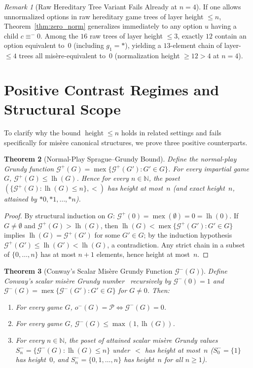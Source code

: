 \documentclass[11pt]{amsart}
\newtheorem{theorem}{Theorem}[section]
\theoremstyle{definition}
\theoremstyle{remark}
\newtheorem{remark}[theorem]{Remark}
\newcommand{\Ppos}{\mathcal{P}}
\newcommand{\Glayer}{\mathcal{G}}
\DeclareMathOperator{\mex}{mex}
\DeclareMathOperator{\lh}{lh}
\DeclareMathOperator{\height}{height}
\begin{document}
\begin{remark}[Raw Hereditary Tree Variant Fails Already at $n = 4$]
If one allows unnormalized options in raw hereditary game trees of layer height $\le n$, Theorem~\ref{thm:zero_norm} generalizes immediately to any option $u$ having a child $c \equiv^- 0$. Among the $16$ raw trees of layer height $\le 3$, exactly $12$ contain an option equivalent to~$0$ (including $g_1 = *$), yielding a $13$-element chain of layer-$\le 4$ trees all mis\`ere-equivalent to~$0$ (normalization height $\ge 12 > 4$ at $n = 4$).
\end{remark}

\section{Positive Contrast Regimes and Structural Scope}
\label{sec:contrast}

To clarify why the bound $\height \le n$ holds in related settings and fails specifically for mis\`ere canonical structures, we prove three positive counterparts.

\begin{theorem}[Normal-Play Sprague--Grundy Bound]
\label{thm:normal}
Define the normal-play Grundy function $\Glayer^+(G) = \mex\{\Glayer^+(G') : G' \in G\}$. For every impartial game $G$, $\Glayer^+(G) \le \lh(G)$. Hence for every $n \in \mathbb{N}$, the poset $(\{\Glayer^+(G) : \lh(G) \le n\}, <)$ has height at most~$n$ (and exact height~$n$, attained by $*0, *1, \dots, *n$).
\end{theorem}

\begin{proof}
By structural induction on $G$: $\Glayer^+(0) = \mex(\emptyset) = 0 = \lh(0)$. If $G \neq \emptyset$ and $\Glayer^+(G) > \lh(G)$, then $\lh(G) < \mex\{\Glayer^+(G') : G' \in G\}$ implies $\lh(G) = \Glayer^+(G')$ for some $G' \in G$; by the induction hypothesis $\Glayer^+(G') \le \lh(G') < \lh(G)$, a contradiction. Any strict chain in a subset of $\{0, \dots, n\}$ has at most $n+1$ elements, hence height at most~$n$.
\end{proof}

\begin{theorem}[Conway's Scalar Mis\`ere Grundy Function $\Glayer^-(G)$]
\label{thm:scalar}
Define Conway's scalar mis\`ere Grundy number~\cite[Ch.~V.4]{SiegelCGT} recursively by $\Glayer^-(0) = 1$ and $\Glayer^-(G) = \mex\{\Glayer^-(G') : G' \in G\}$ for $G \neq 0$. Then:
\begin{enumerate}
  \item For every game $G$, $o^-(G) = \Ppos \iff \Glayer^-(G) = 0$.
  \item For every game $G$, $\Glayer^-(G) \le \max(1, \lh(G))$.
  \item For every $n \in \mathbb{N}$, the poset of attained scalar mis\`ere Grundy values $S_n^- = \{\Glayer^-(G) : \lh(G) \le n\}$ under~$<$ has height at most~$n$ ($S_0^- = \{1\}$ has height~$0$, and $S_n^- = \{0, 1, \dots, n\}$ has height~$n$ for all $n \ge 1$).
\end{enumerate}
\end{theorem}
\end{document}
